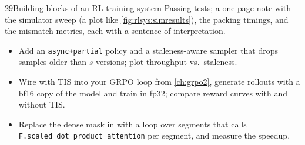 \begin{labbox}{29}{Building blocks of an RL training system}
Passing tests; a one-page note with the simulator sweep (a plot like
\cref{fig:rlsys:simresults}), the packing timings, and the mismatch metrics, each with a
sentence of interpretation.

\begin{itemize}
\item Add an \texttt{async+partial} policy and a staleness-aware sampler that drops samples
older than $s$ versions; plot throughput vs.\ staleness.
\item Wire  with TIS into your GRPO loop from \cref{ch:grpo2}, generate
rollouts with a bf16 copy of the model and train in fp32; compare reward curves with and without
TIS.
\item Replace the dense mask in  with a loop over segments that calls
\texttt{F.scaled\_dot\_product\_attention} per segment, and measure the speedup.
\end{itemize}
\end{labbox}
